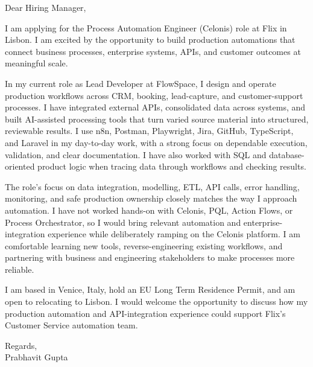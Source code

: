 \documentclass[a4paper,11pt]{article}
\begin{document}
Dear Hiring Manager,

I am applying for the Process Automation Engineer (Celonis) role at Flix in Lisbon. I am excited by the opportunity to build production automations that connect business processes, enterprise systems, APIs, and customer outcomes at meaningful scale.

In my current role as Lead Developer at FlowSpace, I design and operate production workflows across CRM, booking, lead-capture, and customer-support processes. I have integrated external APIs, consolidated data across systems, and built AI-assisted processing tools that turn varied source material into structured, reviewable results. I use n8n, Postman, Playwright, Jira, GitHub, TypeScript, and Laravel in my day-to-day work, with a strong focus on dependable execution, validation, and clear documentation. I have also worked with SQL and database-oriented product logic when tracing data through workflows and checking results.

The role's focus on data integration, modelling, ETL, API calls, error handling, monitoring, and safe production ownership closely matches the way I approach automation. I have not worked hands-on with Celonis, PQL, Action Flows, or Process Orchestrator, so I would bring relevant automation and enterprise-integration experience while deliberately ramping on the Celonis platform. I am comfortable learning new tools, reverse-engineering existing workflows, and partnering with business and engineering stakeholders to make processes more reliable.

I am based in Venice, Italy, hold an EU Long Term Residence Permit, and am open to relocating to Lisbon. I would welcome the opportunity to discuss how my production automation and API-integration experience could support Flix's Customer Service automation team.

Regards,\\
Prabhavit Gupta
\end{document}
